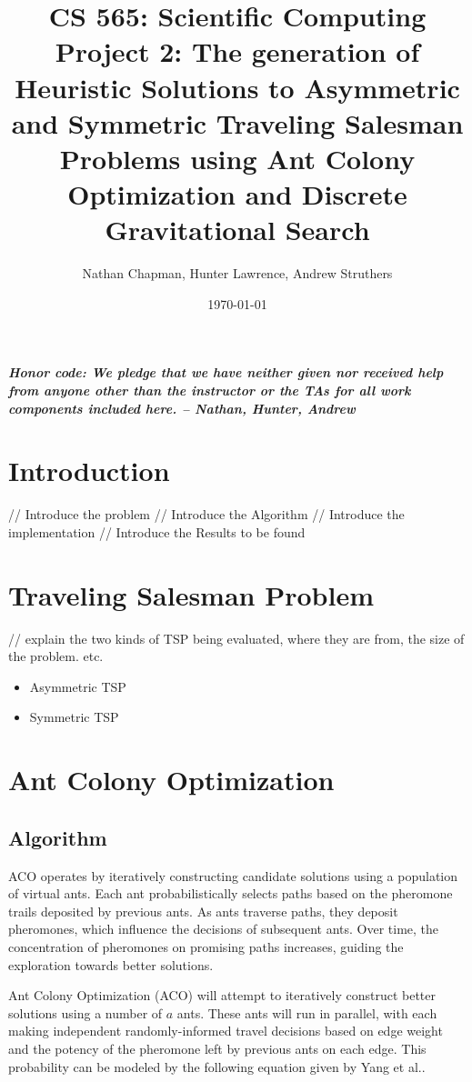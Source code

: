\documentclass{article}
\title{\vspace*{-0.625in}CS 565: Scientific Computing \\ Project 2: The generation of Heuristic Solutions to Asymmetric and Symmetric Traveling Salesman Problems using Ant Colony Optimization and Discrete Gravitational Search\vspace*{-0.25in}}
\author{Nathan Chapman, Hunter Lawrence, Andrew Struthers}
\date{\today}
\begin{document}
\maketitle
\tableofcontents
\pagebreak
\textbf{\textit{Honor code: We pledge that we have neither given nor received help from anyone other than the instructor or the TAs for all work components included here. -- Nathan, Hunter, Andrew}}

\section{Introduction}
    // Introduce the problem
    // Introduce the Algorithm
    // Introduce the implementation
    // Introduce the Results to be found

\section{Traveling Salesman Problem}
    // explain the two kinds of TSP being evaluated, where they are from, the size of the problem. etc.

    \begin{itemize}
        \item Asymmetric TSP
        \item Symmetric TSP
    \end{itemize}

\section{Ant Colony Optimization}

\subsection{Algorithm}
ACO operates by iteratively constructing candidate solutions using a population of virtual ants. Each ant probabilistically selects paths based on the pheromone trails deposited by previous ants. As ants traverse paths, they deposit pheromones, which influence the decisions of subsequent ants. Over time, the concentration of pheromones on promising paths increases, guiding the exploration towards better solutions.

Ant Colony Optimization (ACO) will attempt to iteratively construct better solutions using a number of $a$ ants. These ants will run in parallel, with each making independent randomly-informed travel decisions based on edge weight and the potency of the pheromone left by previous ants on each edge. This probability can be modeled by the following equation given by Yang et al.\cite{yang2008ant}.
\end{document}
